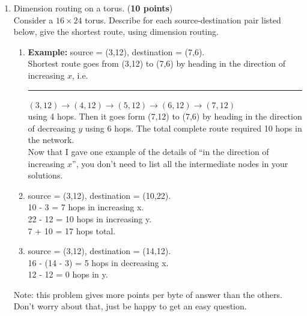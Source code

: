 \documentclass{article}
\newenvironment{answer}
{\color{blue}}
{\normalfont}
\begin{document}
\begin{enumerate}
\begin{enumerate}
      \item  Dimension routing on a torus. (\textbf{10 points})\\
	Consider a $16 \times 24$ torus.
	Describe for each source-destination pair listed below, give the
	shortest route, using dimension routing.
	\begin{enumerate}
	  \item \textbf{Example:} source = (3,12), destination = (7,6).\\
	    Shortest route goes from (3,12) to (7,6) by heading in the
	    direction of increasing $x$, i.e.\\
	    \rule{1.5em}{0ex}%
	    $(3,12)\rightarrow(4,12)\rightarrow(5,12)\rightarrow(6,12)\rightarrow(7,12)$\\
	    using 4 hops.  Then it goes form (7,12) to (7,6) by heading in the direction
	    of decreasing $y$ using 6 hops.  The total complete route required 10 hops
	    in the network.\\
	    Now that I gave one example of the details of ``in the direction of increasing $x$'',
	    you don't need to list all the intermediate nodes in your solutions.
	  \item source = (3,12), destination = (10,22). \\
    \begin{answer}
      10 - 3 = 7 hops in increasing x. \\
      22 - 12 = 10 hops in increasing y. \\
      7 + 10 = 17 hops total. 
    \end{answer}
	  \item source = (3,12), destination = (14,12). \\
	  \begin{answer}
      16 - (14 - 3) = 5 hops in decreasing x. \\
      12 - 12 = 0 hops in y.
    \end{answer}
	\end{enumerate}
	Note: this problem gives more points per byte of answer than the others.
	Don't worry about that, just be happy to get an easy question.
    \end{enumerate}



\end{enumerate}
\end{document}
